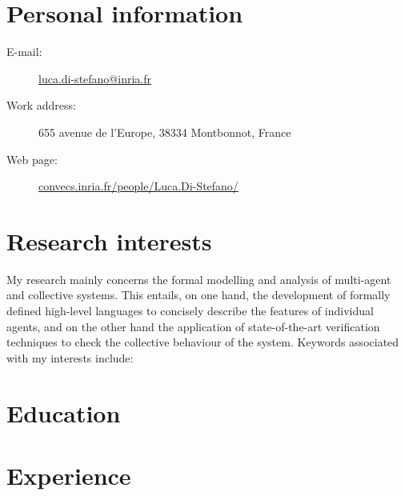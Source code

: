 \documentclass[11pt,a4paper]{moderncv}
\author{Luca Di Stefano}
\date{\today}
\begin{document}
\makeatletter
\bfseries
\noindent {\Large\@author}\vspace*{0.4em}

\normalfont
{}

\noindent{\monthyear\today}
\makeatother

\section*{Personal information}
\begin{description}
    \item[E-mail:] \href{mailto:luca.di-stefano@inria.fr}{luca.di-stefano@inria.fr} 
    \item[Work address:] 655 avenue de l'Europe, 38334 Montbonnot, France
    \item[Web page:] \href{https://convecs.inria.fr/people/Luca.Di-Stefano/}{convecs.inria.fr/people/Luca.Di-Stefano/} 
\end{description}

\section{Research interests}
My research mainly concerns the formal modelling and analysis of multi-agent and
collective systems. This entails, on one hand, the development of formally
defined high-level languages to concisely describe the features of individual
agents, and on the other hand the application of state-of-the-art
verification techniques to check the collective behaviour of the system.
%
Keywords associated with my interests include:



\section*{Education}


\section*{Experience}

\end{document}

